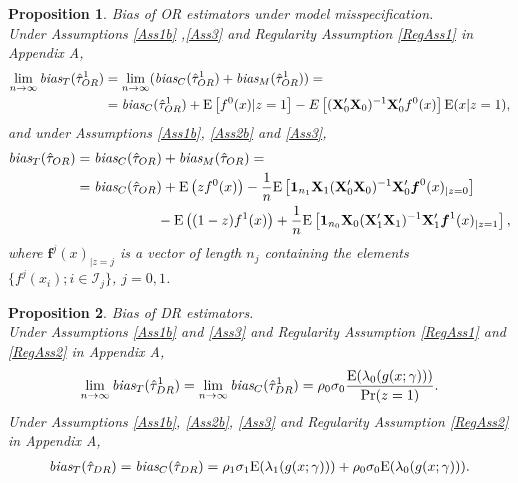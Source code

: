 \documentclass[11pt]{article}
\newtheorem{prop}{Proposition}
\newcommand{\E}{{\mbox{E}}}
\newcommand{\X}{{\bf X}}
\newcommand{\limes}{\lim \limits_{n\to\infty}}
\begin{document}
\begin{prop} \emph{Bias of OR estimators under model misspecification.}\\
Under Assumptions \ref{Ass1b} ,\ref{Ass3} and Regularity Assumption \ref{RegAss1} in Appendix A,
	\begin{align*}
	\limes \emph{bias}_T(\hat \tau^1_{OR}) &=\limes( \emph{bias}_C(\hat \tau^1_{OR})+  \emph{bias}_M(\hat \tau^1_{OR}))=\\
	&= \emph{bias}_C(\hat \tau^1_{OR})+ \E\left[ f^0(x) |z=1\right] - E\left[(\X_0'\X_0)^{-1}\X_0' f^0(x) \right] \E(x|z=1), 
	\end{align*}
 and under Assumptions \ref{Ass1b}, \ref{Ass2b} and \ref{Ass3},
	\begin{align*}
	\emph{bias}_T(\hat \tau_{OR})&= \emph{bias}_C(\hat \tau_{OR})+ \emph{bias}_M(\hat \tau_{OR})=\\
	&=\emph{bias}_C(\hat \tau_{OR})+\E\left(z f^0(x) \right) - \frac{1}{n}\E\left[ {\bf1}_{n_1} \X_1 (\X_0'\X_0)^{-1}\X_0'  \boldsymbol f^0(x)_{|z=0} \right]\\
	&\qquad \qquad \quad \;\;\; - \E\left((1-z) f^1(x)\right) +\frac{1}{n}\E\left[ {\bf1}_{n_0} \X_0 (\X_1'\X_1)^{-1}\X_1'  \boldsymbol f^1(x)_{|z=1} \right],
	\end{align*}
	where $\boldsymbol f^j(x)_{|z=j}$ is a vector of length $n_j$ containing the elements $\{f^j(x_i) ; i \in \mathcal{I}_j\} $, $j=0,1$. 
\label{Prop.OR2}
\end{prop}

\begin{prop} \emph{Bias of DR estimators.}\\ %
Under Assumptions \ref{Ass1b} and \ref{Ass3} and Regularity Assumption \ref{RegAss1} and \ref{RegAss2} in Appendix A,
	\begin{align*}
	\limes \emph{bias}_T (\hat \tau^1_{DR}) =\limes\emph{bias}_C (\hat \tau^1_{DR}) = \rho_0\sigma_0 \frac{\E(\lambda_0(g(x; \gamma)))}{\Pr(z=1)}.
	\end{align*}	
Under Assumptions \ref{Ass1b}, \ref{Ass2b}, \ref{Ass3} and Regularity Assumption \ref{RegAss2} in Appendix A,
	\begin{align*}
	\emph{bias}_T (\hat \tau_{DR})=\emph{bias}_C (\hat \tau_{DR})=  \rho_1\sigma_1 \E(\lambda_1(g(x; \gamma)))+ \rho_0\sigma_0 \E(\lambda_0(g(x; \gamma))).
	\end{align*}
\label{Prop.DR}
\end{prop}
\end{document}
